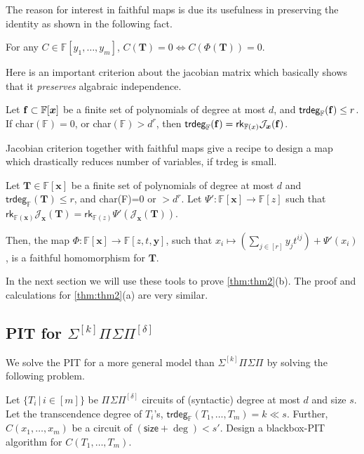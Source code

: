 \documentclass[10pt,a4paper]{article}
\newcommand{\F}{\mathbb{F}}
\newcommand{\x}{{\boldsymbol x}}
\newcommand{\T}{{\boldsymbol T}}
\newcommand{\y}{{\boldsymbol y}}
\newcommand{\calJ}{\mathcal{J}}
\newcommand{\rk}{\mathsf{rk}}
\newcommand{\size}{\mathsf{size}}
\newcommand{\tdeg}{\mathsf{trdeg}}
\newcommand{\PSP}[2]{\Pi^{#1}\Sigma\Pi^{#2}}
\newcommand{\SPSP}[3]{\Sigma^{#1}\Pi^{#2}\Sigma\Pi^{#3}}
\numberwithin{equation}{section}
\begin{document}
The reason for interest in faithful maps is due its usefulness in preserving the identity as shown in the following fact.

\begin{fact}\label{fact:faithful-is-useful}
    For any $C \in \F[y_1,\hdots,y_m]$, $C(\T) = 0 \iff C(\Phi(\T))=0$. 
\end{fact}

Here is an important criterion about the jacobian matrix which basically shows that it \emph{preserves} algabraic independence.
    
\begin{fact} \label{fact:jacobian-criterion}
    Let ${\bf f} \subset \F[\x]$ be a finite set of polynomials of degree at most $d$, and $\tdeg_{\F} ({\bf f}) \le r$. If char$(\F) = 0$, or char$(\F) > d^r$, then $\tdeg_{\F} ({\bf f}) =
    \rk_{\F(x)} \calJ_{\x}({\bf f})$.
\end{fact}

Jacobian criterion together with faithful maps give a recipe to design a map which drastically reduces number of variables, if trdeg is small.

\begin{lemma} \label{lem:faithful}
    Let $\T \in \F[\x]$ be a finite set of polynomials
    of degree at most $d$ and $\tdeg_{\F}(\T) \le r$, and char(F)=$0$ or $> d^r$. Let $\Psi' : \F[\x] \longrightarrow \F[z]$ such that $\rk_{\F(\x)} \calJ_{\x}(\T) = \rk_{\F(z)} \Psi'(\calJ_{\x}(\T))$. 
    
    Then, the map $\Phi : \F[\x] \longrightarrow \F[z,t,\y]$, such that $x_i \mapsto (\sum_{j\in [r]} y_j t^{ij}) + \Psi'(x_i)$, is a faithful homomorphism for $\T$.
\end{lemma}

In the next section we will use these tools to prove \autoref{thm:thm2}(b). The proof and calculations for \autoref{thm:thm2}(a) are very similar.

\subsection{PIT for \texorpdfstring{$\SPSP{[k]}{}{[\delta]}$}{SkPSPdelta}} \label{sec:SkPSPdelta}

We solve the PIT for a more general model than $\SPSP{[k]}{}{}$ by solving the following problem.

\begin{problem}\label{prob:prob1-thm2}
 Let $\{T_i \,|\, i \in [m]\}$ be $\PSP{}{[\delta]}$ circuits of (syntactic) degree at most $d$ and size $s$. Let the transcendence degree of $T_i$'s, $\tdeg_{\F}(T_1,\hdots,T_m)= k\ll s$. Further, $C(x_1,\hdots,x_m)$ be a circuit of $(\size + \deg) < s'$. Design a blackbox-PIT algorithm for $C(T_1,\hdots,T_m)$.
\end{problem}
\end{document}
